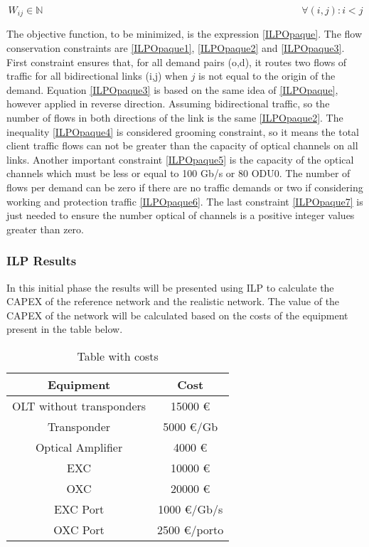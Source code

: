 \begin{equation}
W_{ij} \in \mathbb{N}  \qquad \qquad \qquad \qquad \qquad \qquad \qquad \qquad \qquad \qquad \qquad \qquad \qquad
\forall(i,j) : i < j\label{ILPOpaque7}
\end{equation}

\vspace{10pt}

The objective function, to be minimized, is the expression \ref{ILPOpaque}. The flow conservation constraints are \ref{ILPOpaque1}, \ref{ILPOpaque2} and \ref{ILPOpaque3}. First constraint ensures that, for all demand pairs (o,d), it routes two flows of traffic for all bidirectional links (i,j) when $j$ is not equal to the origin of the demand. Equation \ref{ILPOpaque3} is based on the same idea of \ref{ILPOpaque}, however applied in reverse direction. Assuming bidirectional traffic, so the number of flows in both directions of the link is the same \ref{ILPOpaque2}. The inequality \ref{ILPOpaque4} is considered grooming constraint, so it means the total client traffic flows can not be greater than the capacity of optical channels on all links. Another important constraint \ref{ILPOpaque5} is the capacity of the optical channels which must be less or equal to 100 Gb/s or 80 ODU0. The number of flows per demand can be zero if there are no traffic demands or two if considering working and protection traffic \ref{ILPOpaque6}. The last constraint \ref{ILPOpaque7} is just needed to ensure the number optical of channels is a positive integer values greater than zero.

\subsubsection{ILP Results}

In this initial phase the results will be presented using ILP to calculate the CAPEX of the reference network and the realistic network.
The value of the CAPEX of the network will be calculated based on the costs of the equipment present in the table below.

\begin{table}[h!]
\centering
\begin{tabular}{|| c | c||}
 \hline
 Equipment & Cost \\
 \hline\hline
 OLT without transponders & 15000 \euro \\
 Transponder & 5000 \euro/Gb \\
 Optical Amplifier & 4000 \euro \\
 EXC & 10000 \euro \\
 OXC & 20000 \euro \\
 EXC Port & 1000 \euro /Gb/s\\
 OXC Port & 2500 \euro /porto \\
 \hline
\end{tabular}
\caption{Table with costs}
\label{table_cost1}
\end{table}

